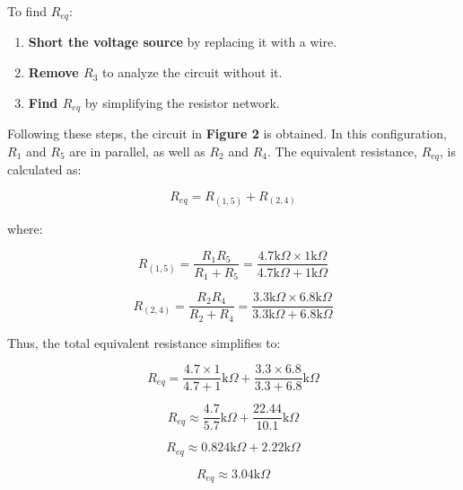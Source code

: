 \documentclass{article}
\begin{document}
To find \( R_{eq} \):
\begin{enumerate}
  \item \textbf{Short the voltage source} by replacing it with a wire.
  \item \textbf{Remove \( R_3 \)} to analyze the circuit without it.
  \item \textbf{Find \( R_{eq} \)} by simplifying the resistor network.
\end{enumerate}

Following these steps, the circuit in \textbf{Figure 2} is obtained. In this configuration, \( R_1 \) and \( R_5 \) are in parallel, as well as \( R_2 \) and \( R_4 \). The equivalent resistance, \( R_{eq} \), is calculated as:

\[
R_{eq} = R_{(1,5)} + R_{(2,4)}
\]

where:

\[
R_{(1,5)} = \frac{R_1 R_5}{R_1 + R_5} = \frac{4.7\text{k}\Omega \times 1\text{k}\Omega}{4.7\text{k}\Omega + 1\text{k}\Omega}
\]

\[
R_{(2,4)} = \frac{R_2 R_4}{R_2 + R_4} = \frac{3.3\text{k}\Omega \times 6.8\text{k}\Omega}{3.3\text{k}\Omega + 6.8\text{k}\Omega}
\]

Thus, the total equivalent resistance simplifies to:

\[
R_{eq} = \frac{4.7 \times 1}{4.7 + 1} \text{k}\Omega + \frac{3.3 \times 6.8}{3.3 + 6.8} \text{k}\Omega
\]

\[
R_{eq} \approx \frac{4.7}{5.7} \text{k}\Omega + \frac{22.44}{10.1} \text{k}\Omega
\]

\[
R_{eq} \approx 0.824\text{k}\Omega + 2.22\text{k}\Omega
\]

\[
R_{eq} \approx 3.04\text{k}\Omega
\]
\end{document}
